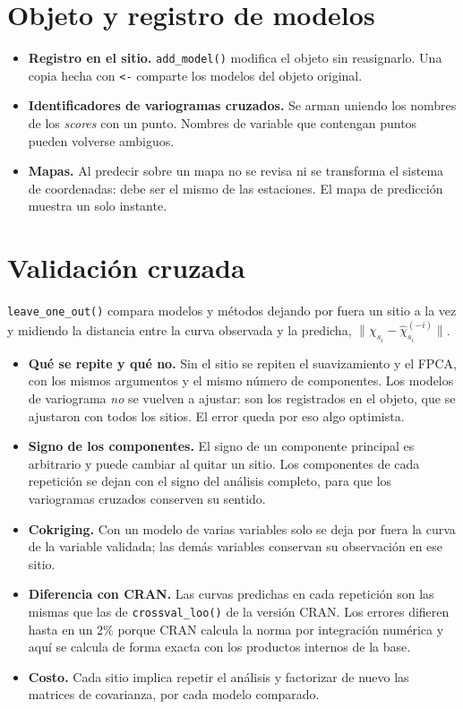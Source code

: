 \documentclass[11pt,a4paper]{article}
\newcommand{\code}[1]{\texttt{#1}}
\begin{document}
\section{Objeto y registro de modelos}

\begin{itemize}
  \item \textbf{Registro en el sitio.} \code{add\_model()} modifica el objeto
        sin reasignarlo. Una copia hecha con \code{\textless-} comparte los modelos
        del objeto original.
  \item \textbf{Identificadores de variogramas cruzados.} Se arman uniendo los
        nombres de los \emph{scores} con un punto. Nombres de variable que
        contengan puntos pueden volverse ambiguos.
  \item \textbf{Mapas.} Al predecir sobre un mapa no se revisa ni se
        transforma el sistema de coordenadas: debe ser el mismo de las
        estaciones. El mapa de predicción muestra un solo instante.
\end{itemize}

\section{Validación cruzada}

\code{leave\_one\_out()} compara modelos y métodos dejando por fuera un sitio
a la vez y midiendo la distancia entre la curva observada y la predicha,
$\lVert \chi_{s_i} - \hat\chi_{s_i}^{(-i)} \rVert$.
\begin{itemize}
  \item \textbf{Qué se repite y qué no.} Sin el sitio se repiten el
        suavizamiento y el FPCA, con los mismos argumentos y el mismo número
        de componentes. Los modelos de variograma \emph{no} se vuelven a
        ajustar: son los registrados en el objeto, que se ajustaron con todos
        los sitios. El error queda por eso algo optimista.
  \item \textbf{Signo de los componentes.} El signo de un componente
        principal es arbitrario y puede cambiar al quitar un sitio. Los
        componentes de cada repetición se dejan con el signo del análisis
        completo, para que los variogramas cruzados conserven su sentido.
  \item \textbf{Cokriging.} Con un modelo de varias variables solo se deja por
        fuera la curva de la variable validada; las demás variables conservan
        su observación en ese sitio.
  \item \textbf{Diferencia con CRAN.} Las curvas predichas en cada repetición
        son las mismas que las de \code{crossval\_loo()} de la versión CRAN.
        Los errores difieren hasta en un 2\% porque CRAN calcula la norma
        por integración numérica y aquí se calcula de forma exacta con los
        productos internos de la base.
  \item \textbf{Costo.} Cada sitio implica repetir el análisis y factorizar de
        nuevo las matrices de covarianza, por cada modelo comparado.
\end{itemize}
\end{document}
